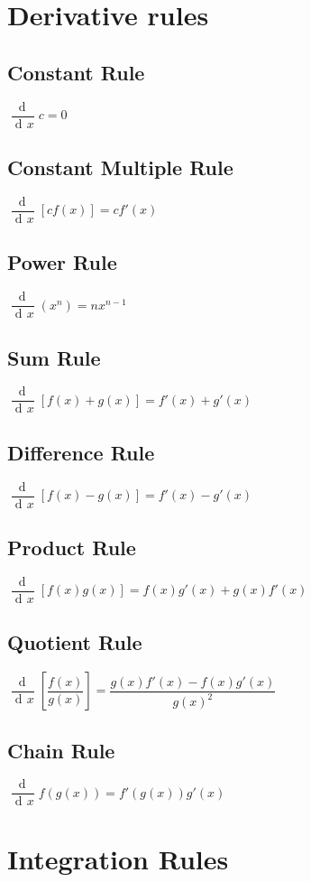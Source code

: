 \documentclass{article}
\newcommand{\dee}{\mathop{\mathrm{d}\!}}
\begin{document}
\Large
    \section{Derivative rules}
    \begin{multicols}{2}
        \subsection{Constant Rule}
        $\dfrac{\dee}{\dee x} c = 0$
        \subsection{Constant Multiple Rule}
        $\dfrac{\dee}{\dee x} [cf(x)] = c f'(x)$
        \subsection{Power Rule}
        $\dfrac{\dee}{\dee x} \left(x^n\right) = nx^{n-1}$
        \subsection{Sum Rule}
        $\dfrac{\dee}{\dee x} [f(x) + g(x)] = f'(x) + g'(x)$
        \subsection{Difference Rule}
        $\dfrac{\dee}{\dee x} [f(x) - g(x)] = f'(x) - g'(x)$
        \subsection{Product Rule}
        $\dfrac{\dee}{\dee x} [f(x)g(x)] = f(x)g'(x) + g(x)f'(x)$ 
        \subsection{Quotient Rule}
        $\dfrac{\dee}{\dee x} \left[\dfrac{f(x)}{g(x)}\right] = \dfrac{g(x)f'(x)-f(x)g'(x)}{g(x)^2}$ 
        \subsection{Chain Rule}
        $\dfrac{\dee}{\dee x} f(g(x)) = f'(g(x))g'(x)$ 
    \end{multicols}

    \section{Integration Rules}
        
\end{document}
